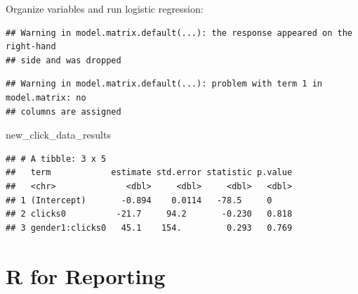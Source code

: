 \documentclass[]{book}
\newenvironment{Shaded}{\begin{snugshade}}{\end{snugshade}}
\newcommand{\DataTypeTok}[1]{\textcolor[rgb]{0.13,0.29,0.53}{#1}}
\newcommand{\KeywordTok}[1]{\textcolor[rgb]{0.13,0.29,0.53}{\textbf{#1}}}
\newcommand{\NormalTok}[1]{#1}
\newcommand{\OperatorTok}[1]{\textcolor[rgb]{0.81,0.36,0.00}{\textbf{#1}}}
\newcommand{\StringTok}[1]{\textcolor[rgb]{0.31,0.60,0.02}{#1}}
\begin{document}
Organize variables and run logistic regression:

\begin{Shaded}
\end{Shaded}

\begin{verbatim}
## Warning in model.matrix.default(...): the response appeared on the right-hand
## side and was dropped
\end{verbatim}

\begin{verbatim}
## Warning in model.matrix.default(...): problem with term 1 in model.matrix: no
## columns are assigned
\end{verbatim}

\begin{Shaded}
\begin{Highlighting}[]
\NormalTok{new_click_data_results}
\end{Highlighting}
\end{Shaded}

\begin{verbatim}
## # A tibble: 3 x 5
##   term            estimate std.error statistic p.value
##   <chr>              <dbl>     <dbl>     <dbl>   <dbl>
## 1 (Intercept)       -0.894    0.0114   -78.5     0    
## 2 clicks0          -21.7     94.2       -0.230   0.818
## 3 gender1:clicks0   45.1    154.         0.293   0.769
\end{verbatim}

\hypertarget{r-for-reporting}{%
\chapter{R for Reporting}\label{r-for-reporting}}
\end{document}
